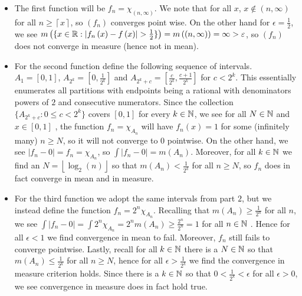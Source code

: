 \documentclass[a4paper]{article}
\begin{document}
\newpage
\begin{problem}[40]
	\begin{itemize}
		\item The first function will be \(f_{n} = \chi_{\left( n, \infty \right) }\). We note that for all \(x \), \(x \not\in \left( n, \infty \right) \) for all \(n \ge \left\lceil x \right\rceil \), so \(\left( f_{n} \right) \) converges point wise. On the other hand for \(\epsilon = \frac{1}{2}\), we see \(m\left( \{x \in \mathbb{R} : \left| f_{n}\left( x \right) - f\left( x \right)  \right| > \frac{1}{2}\}  \right)  = m\left( \left( n, \infty \right)  \right) = \infty > \varepsilon\), so \(\left( f_{n} \right) \) does not converge in measure (hence not in mean).
		\item For the second function define the following sequence of intervals. \(A_{1} = \left[ 0, 1 \right] \), \(A_{2^{k}} = \left[ 0, \frac{1}{2^{k}} \right] \) and \(A_{2^{k} + c} = \left[ \frac{c}{2^{k}}, \frac{c+1}{2^{k}} \right] \) for \(c < 2^{k}\). This essentially enumerates all partitions with endpoints being a rational with denominators powers of \(2\) and consecutive numerators. Since the collection \(\{A_{2^{k} + c} : 0 \le c < 2^{k}\} \) covers \(\left[ 0, 1 \right] \) for every \(k \in \mathbb{N}\), we see  for all \(N \in \mathbb{N}\) and \(x \in \left[ 0, 1 \right] \) , the function \(f_{n} = \chi_{A_{n}}\) will have \(f_{n}\left( x \right) = 1\) for some (infinitely many) \(n \ge N\), so it will not converge to \(0\) pointwise. On the other hand, we see \(\left| f_{n} - 0 \right|= f_{n} = \chi_{A_{n}}\), so \(\int \left| f_{n} - 0 \right| = m\left( A_{n} \right) \). Moreover, for all \(k \in \mathbb{N}\) we find an \(N = \left\lfloor \log_{2}\left( n \right)  \right\rfloor\) so that \(m\left( A_{n} \right) < \frac{1}{2^{k}} \) for all \(n \ge N\), so \(f_{n}\) does in fact converge in mean and in measure.
		\item For the third function we adopt the same intervals from part \(2\), but we instead define the function \(f_{n} = 2^{n} \chi_{A_{n}}\). Recalling that \(m\left( A_{n} \right)\ge \frac{1}{2^{n}} \) for all \(n\), we see \(\int \left| f_{n} - 0 \right|  = \int 2^{n} \chi_{A_{n}} = 2^{n} m\left( A_{n} \right) \ge \frac{2^{n}}{2^{n}} = 1\) for all \(n \in \mathbb{N}\) . Hence for all \(\epsilon < 1\) we find convergence in mean to fail. Moreover, \(f_{n}\) still fails to converge pointwise. Lastly, recall for all \(k \in \mathbb{N}\) there is a \(N \in \mathbb{N}\) so that \(m\left( A_{n} \right)\le \frac{1}{2^{k}} \) for all \(n \ge N\), hence for all \(\epsilon > \frac{1}{2^{k}}\)  we find the convergence in measure criterion holds. Since there is a \(k \in \mathbb{N}\) so that \(0 < \frac{1}{2^{k}} < \epsilon\) for all \(\epsilon > 0\), we see convergence in measure does in fact hold true.
	\end{itemize}
\end{problem}
\end{document}
